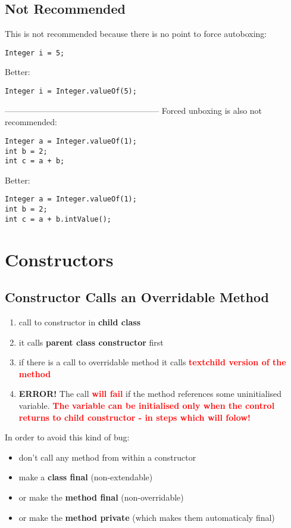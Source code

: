 \documentclass{report}
\begin{document}
\section*{Not Recommended}
This is not recommended because there is no point to force autoboxing:
\begin{verbatim}
Integer i = 5;
\end{verbatim}
Better:
\begin{verbatim}
Integer i = Integer.valueOf(5);
\end{verbatim}
--------------------------------------------------------
\newline
Forced unboxing is also not recommended:
\begin{verbatim}
Integer a = Integer.valueOf(1);
int b = 2;
int c = a + b;
\end{verbatim}
Better:
\begin{verbatim}
Integer a = Integer.valueOf(1);
int b = 2;
int c = a + b.intValue();
\end{verbatim}



\chapter{Constructors}


\section{Constructor Calls an Overridable Method}
\begin{enumerate}
	\item call to constructor in \textbf{child class}
	\item it calls \textbf{parent class constructor} first
	\item if there is a call to overridable method it calls \textcolor{red}{\textbf{textchild version of the method}}
	\item \textbf{ERROR! }The call \textcolor{red}{\textbf{will fail}} if the method references some uninitialised variable.
	\textcolor{red}{\textbf{The variable can be initialised only when the control returns to child constructor - in steps which will folow!}}
\end{enumerate}

In order to avoid this kind of bug:
\begin{itemize}
	\item don't call any method from within a constructor
	\item make a \textbf{class final }(non-extendable)
	\item or make the \textbf{method final} (non-overridable)
	\item or make the \textbf{method private} (which makes them automaticaly final)
\end{itemize}
\end{document}
